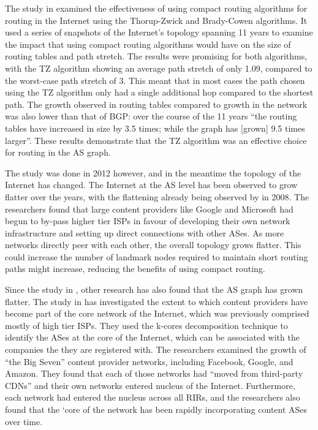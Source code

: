 \documentclass{mpaper}
\begin{document}
The study in \cite{strowes} examined the effectiveness of using compact routing algorithms for routing in the Internet using the Thorup-Zwick and Brady-Cowen algorithms. It used a series of snapshots of the Internet's topology spanning 11 years to examine the impact that using compact routing algorithms would have on the size of routing tables and path stretch. The results were promising for both algorithms, with the TZ algorithm showing an average path stretch of only 1.09, compared to the worst-case path stretch of 3. This meant that in most cases the path chosen using the TZ algorithm only had a single additional hop compared to the shortest path. The growth observed in routing tables compared to growth in the network was also lower than that of BGP: over the course of the 11 years ``the routing tables have increased in size by 3.5 times; while the graph has [grown] 9.5 times larger''. These results demonstrate that the TZ algorithm was an effective choice for routing in the AS graph.

The study was done in 2012 however, and in the meantime the topology of the Internet has changed. The Internet at the AS level has been observed to grow flatter over the years, with the flattening already being observed by \cite{gill} in 2008. The researchers found that large content providers like Google and Microsoft had begun to by-pass higher tier ISPs in favour of developing their own network infrastructure and setting up direct connections with other ASes. As more networks directly peer with each other, the overall topology grows flatter. This could increase the number of landmark nodes required to maintain short routing paths might increase, reducing the benefits of using compact routing. 

Since the study in \cite{gill}, other research has also found that the AS graph has grown flatter. The study in \cite{carisimo} has investigated the extent to which content providers have become part of the core network of the Internet, which was previously comprised mostly of high tier ISPs. They used the k-cores decomposition technique to identify the ASes at the core of the Internet, which can be associated with the companies the they are registered with. The researchers examined the growth of ``the Big Seven'' content provider networks, including Facebook, Google, and Amazon. They found that each of those networks had ``moved from third-party CDNs'' and their own networks entered nucleus of the Internet. Furthermore, each network had entered the nucleus across all RIRs, and the researchers also found that the `core of the network has been rapidly incorporating content ASes over time.
\end{document}
